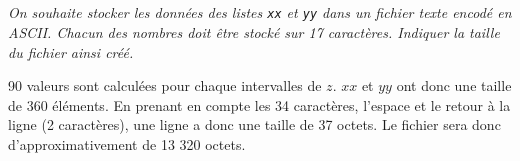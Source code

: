 \documentclass[10pt,fleqn]{article} %
\begin{document}
\fi

\subparagraph{}
\textit{On souhaite stocker les données des listes \texttt{xx} et \texttt{yy} dans un fichier texte encodé en ASCII. Chacun des nombres doit être stocké sur 17 caractères. Indiquer la taille du fichier ainsi créé.}
\ifprof
\begin{corrige}
90 valeurs sont calculées pour chaque intervalles de $z$. $xx$ et $yy$ ont donc une taille de 360 éléments. 
En prenant en compte les 34 caractères, l'espace et le retour à la ligne (2 caractères), une ligne a donc une taille de 37 octets. Le fichier sera donc d'approximativement de 13 320 octets.
\end{corrige}
\else


\fi
\ifprof
\else
%
%
%
\fi
\end{document}
